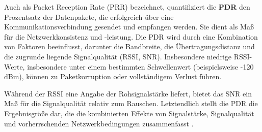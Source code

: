 Auch als Packet Reception Rate (PRR) bezeichnet, quantifiziert die \textbf{PDR} den Prozentsatz der Datenpakete, die erfolgreich über eine Kommunikationsverbindung gesendet und empfangen werden. Sie dient als Maß für die Netzwerkkonsistenz und -leistung. Die PDR wird durch eine Kombination von Faktoren beeinflusst, darunter die Bandbreite, die Übertragungsdistanz und die zugrunde liegende Signalqualität (RSSI, SNR). Insbesondere niedrige RSSI-Werte, insbesondere unter einem bestimmten Schwellenwert (beispielsweise -120 dBm), können zu Paketkorruption oder vollständigem Verlust führen.

Während der RSSI eine Angabe der Rohsignalstärke liefert, bietet das SNR ein Maß für die Signalqualität relativ zum Rauschen. Letztendlich stellt die PDR die Ergebnisgröße dar, die die kombinierten Effekte von Signalstärke, Signalqualität und vorherrschenden Netzwerkbedingungen zusammenfasst \autocite{RSSISNR}.